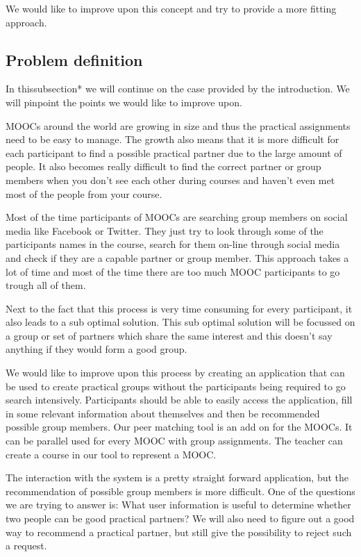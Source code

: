 We would like to improve upon this concept and try to provide a more fitting approach.

\subsection*{Problem definition}
In thissubsection* we will continue on the case provided by the introduction.
We will pinpoint the points we would like to improve upon.

MOOCs around the world are growing in size and thus the practical assignments need to be easy to manage.
The growth also means that it is more difficult for each participant to find a possible practical partner due to the large amount of people.
It also becomes really difficult to find the correct partner or group members when you don't see each other during courses and haven't even met most of the people from your course.

Most of the time participants of MOOCs are searching group members on social media like Facebook or Twitter.
They just try to look through some of the participants names in the course, search for them on-line through social media and check if they are a capable partner or group member.
This approach takes a lot of time and most of the time there are too much MOOC participants to go trough all of them.

Next to the fact that this process is very time consuming for every participant, it also leads to a sub optimal solution.
This sub optimal solution will be focussed on a group or set of partners which share the same interest and this doesn't say anything if they would form a good group.

We would like to improve upon this process by creating an application that can be used to create practical groups without the participants being required to go search intensively.
Participants should be able to easily access the application, fill in some relevant information about themselves and then be recommended possible group members.
Our peer matching tool is an add on for the MOOCs. 
It can be parallel used for every MOOC with group assignments.
The teacher can create a course in our tool to represent a MOOC.

The interaction with the system is a pretty straight forward application, but the recommendation of possible group members is more difficult.
One of the questions we are trying to answer is: What user information is useful to determine whether two people can be good practical partners?
We will also need to figure out a good way to recommend a practical partner, but still give the possibility to reject such a request.\\

